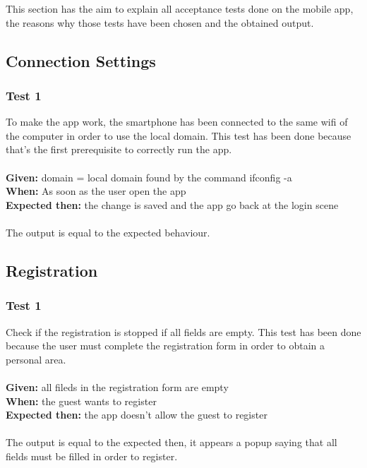 This section has the aim to explain all acceptance tests done on the mobile app, the reasons why those tests have been chosen and the obtained output.
\subsection{Connection Settings}

\subsubsection{\Large{Test 1}}
To make the app work, the smartphone has been connected to the same wifi of the computer in order to use the local domain. This test has been done because that's the first prerequisite to correctly run the app.\\
\\
\textbf{Given: } domain = local domain found by the command ifconfig -a \\
\textbf{When: } As soon as the user open the app\\
\textbf{Expected then: } the change is saved and  the app go back at the login scene\\
\\
The output is equal to the expected behaviour.

\subsection{Registration}

\subsubsection{\Large{Test 1}}
Check if the registration is stopped if all fields are empty. This test has been done because the user must complete the registration form in order to obtain a personal area.\\
\\
\textbf{Given: } all fileds in the registration form are empty\\
\textbf{When: } the guest wants to register\\
\textbf{Expected then: } the app doesn't allow the guest to register\\
\\
The output is equal to the expected then, it appears a popup saying that all fields must be filled in order to register.

